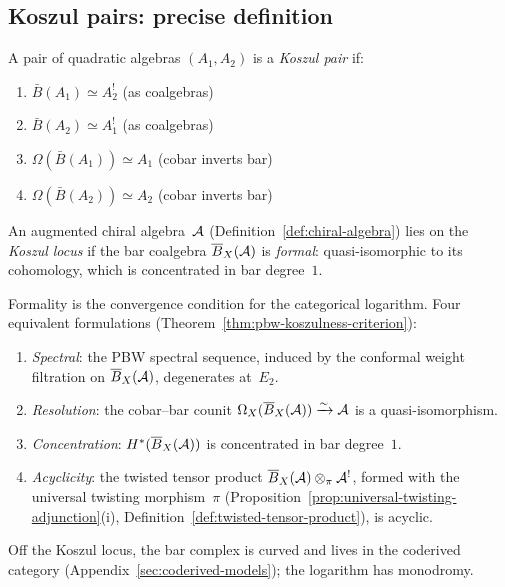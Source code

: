 \subsection{Koszul pairs: precise definition}

\begin{definition}
\label{def:koszul-pair-classical}
A pair of quadratic algebras $(A_1, A_2)$ is a \emph{Koszul pair} if:
\begin{enumerate}
\item $\bar{B}(A_1) \simeq A_2^!$ (as coalgebras)
\item $\bar{B}(A_2) \simeq A_1^!$ (as coalgebras)
\item $\Omega(\bar{B}(A_1)) \simeq A_1$ (cobar inverts bar)
\item $\Omega(\bar{B}(A_2)) \simeq A_2$ (cobar inverts bar)
\end{enumerate}
\end{definition}

\begin{definition}\label{def:koszul-locus}
An augmented chiral algebra~$\mathcal{A}$
(Definition~\ref{def:chiral-algebra}) lies on the
\emph{Koszul locus} if the bar coalgebra
$\overline{B}_X(\mathcal{A})$ is \emph{formal}: quasi-isomorphic to its
cohomology, which is concentrated in bar degree~$1$.

Formality is the convergence condition for the categorical
logarithm.  Four equivalent formulations
(Theorem~\ref{thm:pbw-koszulness-criterion}):
\begin{enumerate}[label=\textup{(\alph*)}]
\item \emph{Spectral}: the PBW spectral sequence, induced by
  the conformal weight filtration on $\overline{B}_X(\mathcal{A})$,
  degenerates at~$E_2$.
\item \emph{Resolution}: the cobar--bar counit
  $\Omega_X(\overline{B}_X(\mathcal{A})) \xrightarrow{\sim} \mathcal{A}$ is a
  quasi-isomorphism.
\item \emph{Concentration}: $H^*(\overline{B}_X(\mathcal{A}))$ is
  concentrated in bar degree~$1$.
\item \emph{Acyclicity}: the twisted tensor product
  $\overline{B}_X(\mathcal{A}) \otimes_\pi \mathcal{A}^!$, formed with the universal
  twisting morphism~$\pi$
  (Proposition~\ref{prop:universal-twisting-adjunction}(i),
  Definition~\ref{def:twisted-tensor-product}), is acyclic.
\end{enumerate}
Off the Koszul locus, the bar complex is curved and lives in
the coderived category (Appendix~\ref{sec:coderived-models});
the logarithm has monodromy.
\end{definition}

